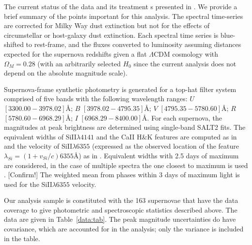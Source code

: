 \documentclass{aastex}   	%
\begin{document}
The current status of the data and its treatment s presented in \citet{2015ApJ...815...58F}.
We provide a brief summary of the points important for this analysis.
The spectral time-series  are corrected for Milky Way dust
extinction \citep{1989ApJ...345..245C,1998ApJ...500..525S} but not for the
effects of circumstellar or host-galaxy dust extinction.  
Each spectral time series is
blue-shifted to rest-frame, and the fluxes converted to luminosity assuming
distances expected for the supernova redshifts given a flat
$\Lambda$CDM cosmology with $\Omega_M = 0.28$ (with an arbitrarily selected
$H_0$ since the current analysis does not depend on the absolute magnitude scale).

Supernova-frame synthetic photometry is generated for a top-hat filter system
comprised of five 
\color{red}
bands with the following wavelength ranges: $U$ $[3300.00 - 3978.02]$\AA;
$B$ $[3978.02-4795.35]$\AA;
$V$ $[4795.35-5780.60]$\AA;
$R$ $[5780.60-6968.29]$\AA;
$I$ $[6968.29-8400.00]$\AA.
\color{black}
For each supernova, the magnitudes at peak brightness are determined using single-band SALT2 fits.
The equivalent widths of SiII$\lambda 4141$ and the CaII H\&K features are computed as
in \citet{2008A&A...477..717B} and the  velocity of SiII$\lambda 6355$ (expressed as the
observed location of the feature $\lambda_{Si} = (1+v_{Si}/c) 6355$\AA)
as in \citet{chotard:thesis}.
Equivalent widths with 2.5 days of maximum are considered, in the case of multiple spectra the one
closest to maximum is used \citep{chotard:thesis}. [Confirm!]
The weighted mean from phases within 3 days of maximum light is used for the  SiII$\lambda 6355$ velocity.

Our analysis sample is constituted with the  163 supernovae that have the data coverage to 
give photometric and spectroscopic statistics described above.
The data are given in Table~\ref{data:tab}.
The peak magnitude uncertainties do have covariance, which are accounted
for in the analysis; only the variance is included in the table.
\end{document}
